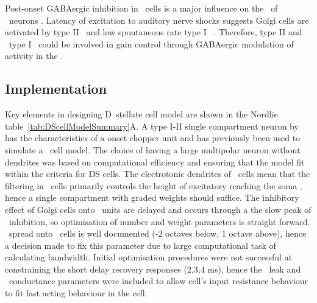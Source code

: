 
Post-onset GABAergic inhibition in \DS~cells is a major influence on the
\PSTH~of \OnC~neurons \citep{FerragamoGoldingEtAl:1998a,EvansZhao:1998}. Latency
of excitation to auditory nerve shocks suggests Golgi cells are activated by
type II \ANFs~and low spontaneous rate type I
\ANFs~\citep{BensonBerglundEtAl:1996, FerragamoGoldingEtAl:1998}. Therefore,
type II and \LSR~type I \ANFs~could be involved in gain control through
GABAergic modulation of activity in the \VCN\@.






\subsection{Implementation    \label{sec:DS:implementation}}
 

Key elements in designing D~stellate cell model are shown in the Nordlie
table~\ref{tab:DScellModelSummary}A. A type I-II single compartment neuron
by \citet{RothmanManis:2003b} has the characteristics of a onset chopper
unit and has previously been used to simulate a \DS~cell model. The choice
of having a large multipolar neuron without dendrites was based on
computational efficiency and ensuring that the model fit within the
criteria for DS cells. The electrotonic dendrites of \DS~cells mean that
the filtering in \DS~cells primarily controls the height of excitatory
{\PSPs} reaching the soma \citep{WhiteYoungEtAl:1994}, hence a single
compartment with graded weights should suffice. The inhibitory effect of
Golgi cells onto \DS~units are delayed and occurs through a the slow peak
of \GABAa~inhibition, so optimisation of number and weight parameters is
straight forward. \ANF~spread onto \DS~cells is well documented (-2 octaves
below, 1 octave above), hence a decision made to fix this parameter due to
large computational task of calculating bandwidth. Initial optimisation
procedures were not successful at constraining the short delay recovery
responses (2,3,4 ms), hence the \DS~leak and \KLT~conductance parameters
were included to allow cell's input resistance behaviour to fit fast acting
behaviour in the cell.

